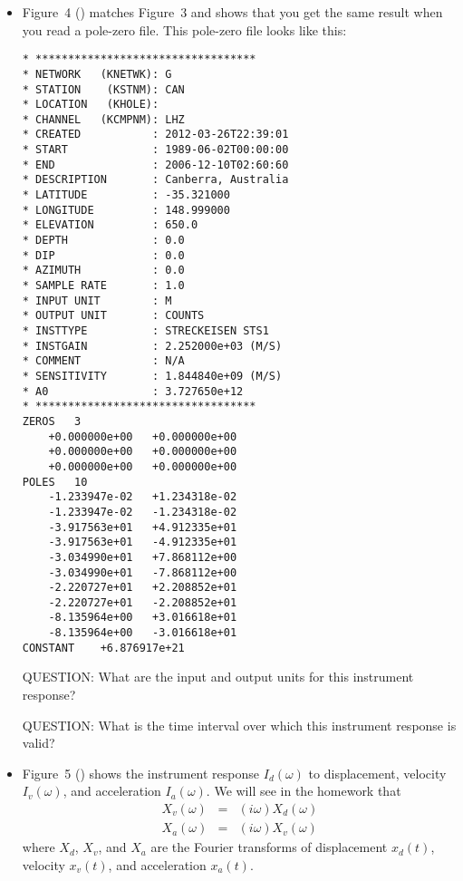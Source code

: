 \documentclass[11pt,titlepage,fleqn]{article}
\begin{document}
\begin{itemize}
\item Figure~4 () matches Figure~3 and shows that you get the same result when you read a pole-zero file. This pole-zero file looks like this:
%
\small
\begin{spacing}{1.0}
\begin{verbatim}
* **********************************
* NETWORK   (KNETWK): G
* STATION    (KSTNM): CAN
* LOCATION   (KHOLE): 
* CHANNEL   (KCMPNM): LHZ
* CREATED           : 2012-03-26T22:39:01
* START             : 1989-06-02T00:00:00
* END               : 2006-12-10T02:60:60
* DESCRIPTION       : Canberra, Australia
* LATITUDE          : -35.321000
* LONGITUDE         : 148.999000 
* ELEVATION         : 650.0  
* DEPTH             : 0.0  
* DIP               : 0.0  
* AZIMUTH           : 0.0  
* SAMPLE RATE       : 1.0
* INPUT UNIT        : M
* OUTPUT UNIT       : COUNTS
* INSTTYPE          : STRECKEISEN STS1
* INSTGAIN          : 2.252000e+03 (M/S)
* COMMENT           : N/A
* SENSITIVITY       : 1.844840e+09 (M/S)
* A0                : 3.727650e+12
* **********************************
ZEROS	3
	+0.000000e+00	+0.000000e+00
	+0.000000e+00	+0.000000e+00
	+0.000000e+00	+0.000000e+00
POLES	10
	-1.233947e-02	+1.234318e-02
	-1.233947e-02	-1.234318e-02
	-3.917563e+01	+4.912335e+01
	-3.917563e+01	-4.912335e+01
	-3.034990e+01	+7.868112e+00
	-3.034990e+01	-7.868112e+00
	-2.220727e+01	+2.208852e+01
	-2.220727e+01	-2.208852e+01
	-8.135964e+00	+3.016618e+01
	-8.135964e+00	-3.016618e+01
CONSTANT	+6.876917e+21
\end{verbatim}
\end{spacing}
\normalsize

QUESTION: What are the input and output units for this instrument response?

QUESTION: What is the time interval over which this instrument response is valid?


\item Figure~5 () shows the instrument response $I_d(\omega)$ to displacement, velocity $I_v(\omega)$, and acceleration $I_a(\omega)$. We will see in the homework that 
%
\begin{eqnarray*}
X_v(\omega) &=& (i\omega) X_d(\omega)
\\
X_a(\omega) &=& (i\omega) X_v(\omega)
\end{eqnarray*}
%
where $X_d$, $X_v$, and $X_a$ are the Fourier transforms of displacement $x_d(t)$, velocity $x_v(t)$, and acceleration $x_a(t)$.


\end{itemize}
\end{document}
